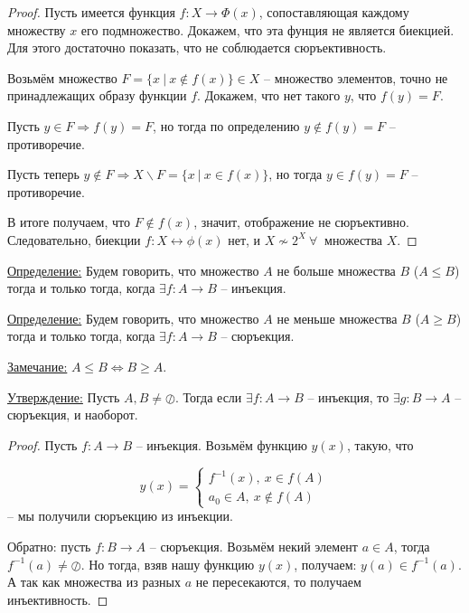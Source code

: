 \documentclass[a4paper, 12pt]{article}
\newcommand{\definition}{\underline{Определение:} }
\newcommand{\statement}{\underline{Утверждение:} }
\newcommand{\note}{\underline{Замечание:} }
\begin{document}
\begin{proof}
    
    Пусть имеется функция $f: X \to \Phi(x)$, сопоставляющая каждому множеству $x$ его подмножество. Докажем, что эта фунция не является биекцией. Для этого достаточно показать, что не соблюдается сюръективность.
    
    Возьмём множество $F = \{x \  | \ x \notin f(x)\} \in X$ -- множество элементов, точно не принадлежащих образу функции $f$. Докажем, что нет такого $y$, что $f(y) = F$.
    
    Пусть $y \in F \Rightarrow f(y) = F$, но тогда по определению $y \notin f(y) = F$ -- противоречие.
    
    Пусть теперь $y \notin F \Rightarrow X \backslash F = \{x \ | \ x \in f(x)\}$, но тогда $y \in f(y) = F$ -- противоречие. 
    
    В итоге получаем, что $F \notin f(x)$, значит, отображение не сюръективно. Следовательно, биекции $f: X \leftrightarrow \phi(x)$ нет, и $X \nsim 2^{X} \ \forall \ $ множества $X$.


\end{proof}

\definition{Будем говорить, что множество $A$ не больше множества $B$ ($A \leq B$) тогда и только тогда, когда $\exists f: A \to B$ -- инъекция.}

\vspace{\baselineskip}
\definition{Будем говорить, что множество $A$ не меньше множества $B$ ($A \geq B$) тогда и только тогда, когда $\exists f: A \to B$ -- сюръекция.}

\vspace{\baselineskip}
\note{$A \leq B \Longleftrightarrow B \geq A$.}

\vspace{\baselineskip}
\statement{Пусть $A, B \neq \oslash$. Тогда если $\exists f: A \to B$ -- инъекция, то $\exists g: B \to A$ -- сюръекция, и наоборот.}

\begin{proof}
Пусть $f: A \to B$ -- инъекция. Возьмём функцию $y(x)$, такую, что

\[
    y(x) = \begin{cases}
        f^{-1}(x), \  x \in f(A) \\
        a_{0} \in A, \  x \notin f(A)
    \end{cases}
\]
 -- мы получили сюръекцию из инъекции.
 
 Обратно: пусть $f: B \to  A$ -- сюръекция. Возьмём некий элемент $a \in A$, тогда $f^{-1}(a) \neq \oslash$. Но тогда, взяв нашу функцию $y(x)$, получаем: $y(a) \in f^{-1}(a)$. А так как множества из разных $a$ не пересекаются, то получаем инъективность.

\end{proof}
    
\end{document}
